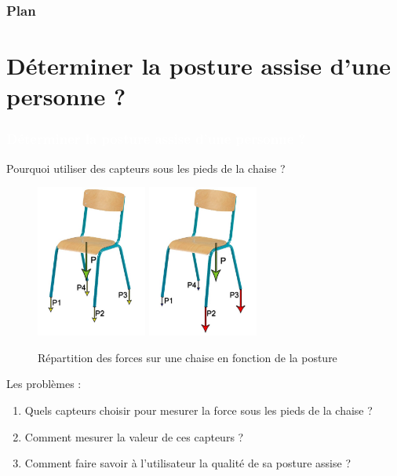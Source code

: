 \documentclass{beamer}
\begin{document}
\begin{frame}
\frametitle{Plan}
\tableofcontents
\end{frame}

\section{Déterminer la posture assise d'une personne ?}
\begin{frame}
\frametitle{\textcolor{white}{Déterminer la posture assise d'une personne ?}}
Pourquoi utiliser des capteurs sous les pieds de la chaise ?
\begin{figure}
\begin{center}
\includegraphics[height=5cm]{images/Chaise_forces_homo.jpg}
\includegraphics[height=5cm]{images/Chaise_forces_hetero.jpg}
\end{center}
\caption{Répartition des forces sur une chaise en fonction de la posture}
\label{fig:chaise_repartition}
\end{figure}
\end{frame}


\begin{frame}
\begin{block}{Les problèmes :}
\begin{enumerate}
\item Quels capteurs choisir pour mesurer la force sous les pieds de la chaise ?
\item Comment mesurer la valeur de ces capteurs ?
\item Comment faire savoir à l'utilisateur la qualité de sa posture assise ?
\end{enumerate}
\end{block}
\end{frame}
\end{document}
